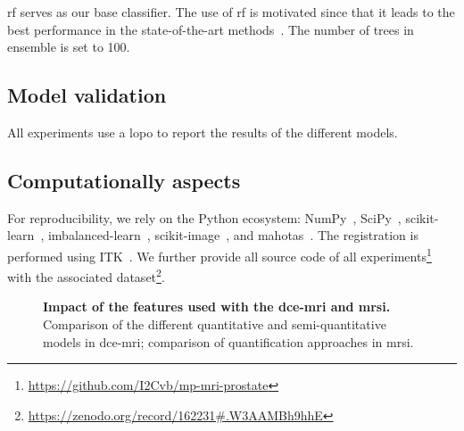 \documentclass[final,3p,times,twocolumn]{elsarticle}
\begin{document}
\ac{rf} serves as our base classifier. The use of \ac{rf} is motivated since
that it leads to the best performance in the state-of-the-art
methods~\cite{Litjens2014,lemaitre2015computer}. The number of trees in
ensemble is set to 100.

\subsection{Model validation}

All experiments use a \ac{lopo} to report the results of the different models.

\subsection{Computationally aspects}

For reproducibility, we rely on the Python ecosystem:
NumPy~\cite{walt2011numpy}, SciPy~\cite{jones2014scipy},
scikit-learn~\cite{pedregosa2011scikit},
imbalanced-learn~\cite{lemaitre2017imbalanced},
scikit-image~\cite{van2014scikit},
and mahotas~\cite{coelho2012mahotas}. The registration is performed using
ITK~\cite{ibanez2005itk}. We further provide all source code of all
experiments\footnote{\url{https://github.com/I2Cvb/mp-mri-prostate}} with the
associated
dataset\footnote{\url{https://zenodo.org/record/162231#.W3AAMBh9hhE}}.

\begin{figure}
  \hspace*{\fill}
  \hfill
  \hspace*{\fill}
  \caption[]{\textbf{Impact of the features used with the \ac{dce}-\ac{mri} and
    \ac{mrsi}.} \protect{} Comparison of the different
  quantitative and semi-quantitative models in \ac{dce}-\ac{mri};
  \protect{} comparison of quantification approaches in
  \ac{mrsi}.}
  \label{fig:dce_results}
\end{figure}
\end{document}
